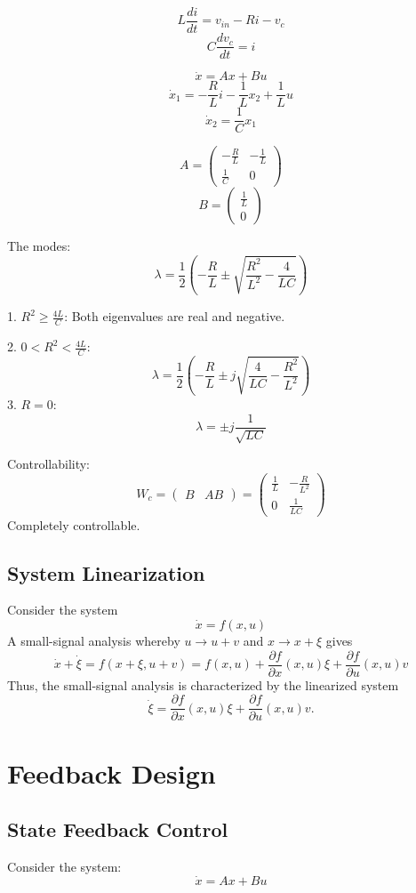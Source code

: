 \documentclass{article}
\begin{document}
\[
L \frac{di}{dt} = v_{in} - Ri - v_c
\]
\[
C \frac{dv_c}{dt} = i
\]

\[
\dot{x} = Ax + Bu
\]
\[
\dot{x}_1 = -\frac{R}{L} i - \frac{1}{L} x_2 + \frac{1}{L} u
\]
\[
\dot{x}_2 = \frac{1}{C} x_1
\]

\[
A = \begin{pmatrix}
-\frac{R}{L} & -\frac{1}{L} \\
\frac{1}{C} & 0
\end{pmatrix}
\]
\[
B = \begin{pmatrix}
\frac{1}{L} \\
0
\end{pmatrix}
\]

The modes:
\[
\lambda = \frac{1}{2} \left( -\frac{R}{L} \pm \sqrt{\frac{R^2}{L^2} - \frac{4}{LC}} \right)
\]

1. \( R^2 \geq \frac{4L}{C} \): Both eigenvalues are real and negative.

2. \( 0 < R^2 < \frac{4L}{C} \):
\[
\lambda = \frac{1}{2} \left( -\frac{R}{L} \pm j \sqrt{\frac{4}{LC} - \frac{R^2}{L^2}} \right)
\]
3. \( R = 0 \):
\[
\lambda = \pm j \frac{1}{\sqrt{LC}}
\]

Controllability:
\[
W_c = \begin{pmatrix}
B & AB
\end{pmatrix}
= \begin{pmatrix}
\frac{1}{L} & -\frac{R}{L^2} \\
0 & \frac{1}{LC}
\end{pmatrix}
\]
Completely controllable.

\subsection{System Linearization}
Consider the system
\[
\dot{x} = f(x, u)
\]
A small-signal analysis whereby \( u \rightarrow u + v \) and \( x \rightarrow x + \xi \) gives
\[
\dot{x} + \dot{\xi} = f(x + \xi, u + v) = f(x, u) + \frac{\partial f}{\partial x}(x, u)\xi + \frac{\partial f}{\partial u}(x, u)v
\]
Thus, the small-signal analysis is characterized by the linearized system
\[
\dot{\xi} = \frac{\partial f}{\partial x}(x, u)\xi + \frac{\partial f}{\partial u}(x, u)v.
\]

\section{Feedback Design}

\subsection{State Feedback Control}
Consider the system:
\[
\dot{x} = Ax + Bu
\]
\end{document}
